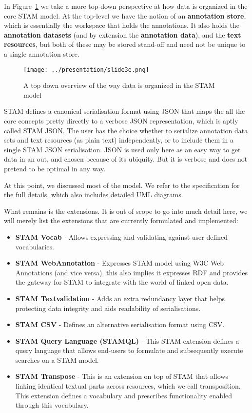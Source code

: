 \documentclass{jors}
\begin{document}
In Figure~\ref{fig:modelintro3} we take a more top-down perspective at how data
is organized in the core STAM model. At the top-level we have the notion of an
\textbf{annotation store}, which is essentially the workspace that
holds the annotations. It also holds the \textbf{annotation datasets} (and by
extension the \textbf{annotation data}), and the \textbf{text resources},
but both of these may be stored stand-off and need not be unique to a single
annotation store.

\begin{figure}[h]
\texttt{[image: ../presentation/slide3e.png]}
\caption{A top down overview of the way data is organized in the STAM model}
\label{fig:modelintro3}
\end{figure}

STAM defines a canonical serialisation format using JSON that maps the all the
core concepts pretty directly to a verbose JSON representation, which is aptly
called STAM JSON. The user has the choice whether to serialize annotation data
sets and text resources (as plain text) independently, or to include them in a
single STAM JSON serialisation. JSON is used only here as an easy way to get
data in an out, and chosen because of its ubiquity. But it is verbose and does not
pretend to be optimal in any way.

At this point, we discussed most of the model. We refer to the
specification for the full details, which also includes detailed UML diagrams.

What remains is the extensions. It is out of scope to go into much detail here,
we will merely list the extensions that are currently formulated and
implemented:

\begin{itemize}
\item \textbf{STAM Vocab} - Allows expressing and validating against user-defined vocabularies.
\item \textbf{STAM WebAnnotation} - Expresses STAM model using W3C Web Annotations (and vice versa), this also implies it expresses RDF and provides the gateway for STAM to integrate with the world of linked open data.
\item \textbf{STAM Textvalidation} - Adds an extra redundancy layer that helps protecting data integrity and aids readability of serialisations.
\item \textbf{STAM CSV} - Defines an alternative serialisation format using CSV.
\item \textbf{STAM Query Language (STAMQL)} - This STAM extension defines a query language that allows end-users to formulate and subsequently execute searches on a STAM model.
\item \textbf{STAM Transpose} - This is an extension on top of STAM that allows linking identical textual parts across resources, which we call transposition. This extension defines a vocabulary and prescribes functionality enabled through this vocabulary.
\end{itemize}
\end{document}
